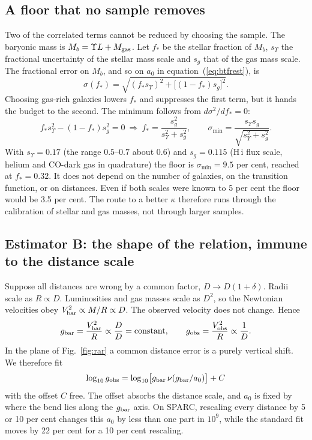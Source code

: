 \documentclass[fleqn,usenatbib]{mnras}
\begin{document}
\subsection{A floor that no sample removes}
\label{sec:floor}
Two of the correlated terms cannot be reduced by choosing the sample. The baryonic mass is $M_b=\Upsilon L+M_{\rm gas}$. Let $f_*$ be the stellar fraction of $M_b$, $s_\Upsilon$ the fractional uncertainty of the stellar mass scale and $s_g$ that of the gas mass scale. The fractional error on $M_b$, and so on $a_0$ in equation~(\ref{eq:btfrest}), is
\begin{equation}
\sigma(f_*)=\sqrt{(f_*s_\Upsilon)^2+\big[(1-f_*)s_g\big]^2} .
\end{equation}
Choosing gas-rich galaxies lowers $f_*$ and suppresses the first term, but it hands the budget to the second. The minimum follows from $d\sigma^2/df_*=0$:
\begin{equation}
f_*s_\Upsilon^2-(1-f_*)s_g^2=0\ \Longrightarrow\ f_*=\frac{s_g^2}{s_\Upsilon^2+s_g^2},\qquad
\sigma_{\min}=\frac{s_\Upsilon s_g}{\sqrt{s_\Upsilon^2+s_g^2}} .
\label{eq:floor}
\end{equation}
With $s_\Upsilon=0.17$ (the range $0.5$--$0.7$ about $0.6$) and $s_g=0.115$ (H\,{\sc i} flux scale, helium and CO-dark gas in quadrature) the floor is $\sigma_{\min}=9.5$ per cent, reached at $f_*=0.32$. It does not depend on the number of galaxies, on the transition function, or on distances. Even if both scales were known to 5 per cent the floor would be 3.5 per cent. The route to a better $\kappa$ therefore runs through the calibration of stellar and gas masses, not through larger samples.

\subsection{Estimator B: the shape of the relation, immune to the distance scale}
\label{sec:shape}
Suppose all distances are wrong by a common factor, $D\to D(1+\delta)$. Radii scale as $R\propto D$. Luminosities and gas masses scale as $D^2$, so the Newtonian velocities obey $V_{\rm bar}^2\propto M/R\propto D$. The observed velocity does not change. Hence
\begin{equation}
g_{\rm bar}=\frac{V_{\rm bar}^2}{R}\propto\frac{D}{D}=\text{constant},\qquad g_{\rm obs}=\frac{V_{\rm obs}^2}{R}\propto\frac1D .
\end{equation}
In the plane of Fig.~\ref{fig:rar} a common distance error is a purely vertical shift. We therefore fit
\begin{equation}
\log_{10}g_{\rm obs}=\log_{10}\!\big[g_{\rm bar}\,\nu(g_{\rm bar}/a_0)\big]+C
\end{equation}
with the offset $C$ free. The offset absorbs the distance scale, and $a_0$ is fixed by where the bend lies along the $g_{\rm bar}$ axis. On SPARC, rescaling every distance by 5 or 10 per cent changes this $a_0$ by less than one part in $10^{9}$, while the standard fit moves by 22 per cent for a 10 per cent rescaling.
\end{document}
